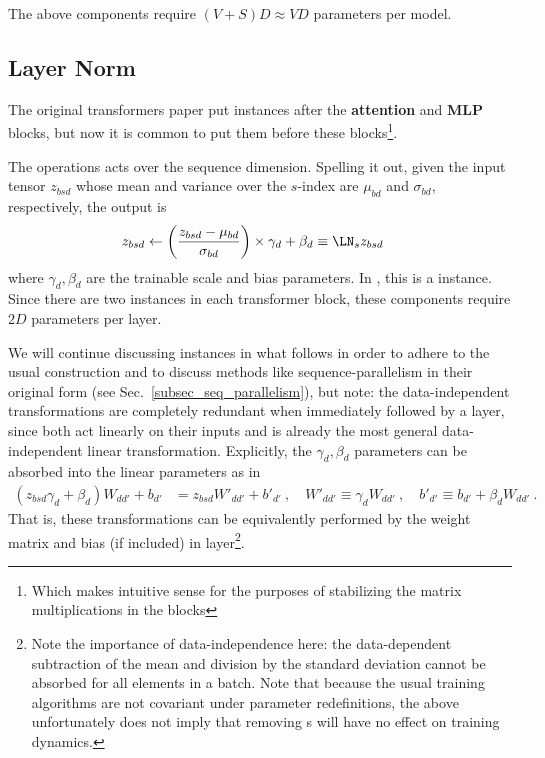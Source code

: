 \documentclass[11pt]{article}
\begin{document}
The above components require $ (V+S)D \approx VD $ parameters per model.



\subsection{Layer Norm \label{subsubsec_layer_norm} }

The original transformers paper \cite{vaswani2017attention} put  instances after
the \textbf{attention} and \textbf{MLP} blocks, but now it is common \cite{xiong2020layer} to put
them before these blocks\footnote{Which makes intuitive sense for the purposes of stabilizing the
	matrix multiplications in the blocks}.

The  operations acts over the sequence dimension. Spelling it out, given the
input tensor $ z _{ bsd } $ whose mean and variance over the $ s $-index are $ \mu _{ bd } $ and $
	\sigma _{ bd } $, respectively, the  output is
\begin{align}
	z _{ bsd } & \leftarrow \left ( \frac{ z _{ bsd } - \mu _{ bd } }{ \sigma _{ bd } } \right )\times \gamma _{ d }
	+ \beta _{ d } \equiv \LN _{ s } z _{ bsd}
\end{align}
where $ \gamma _{ d }, \beta  _{ d } $ are the trainable scale and bias parameters. In
, this is a  instance.
Since there are two  instances in each transformer block, these components require
$ 2D $ parameters per layer.

We will continue discussing  instances in what follows in order to adhere to the
usual construction and to discuss methods like sequence-parallelism in their original form (see
Sec.~\ref{subsec_seq_parallelism}), but note: the data-independent 
transformations are completely redundant when immediately followed by a  layer,
since both act linearly on their inputs and  is already the most general
data-independent linear transformation. Explicitly, the  $ \gamma _{ d }, \beta _{ d } $ parameters
can be absorbed into the linear parameters as in
\begin{align}
	\left (     z _{ bsd } \gamma _{ d } + \beta _{ d } \right )  W _{d d'}    + b _{ d' } & = z _{ bsd }
	W' _{ d d' } + b' _{ d' } \ , \quad W' _{ d d' } \equiv  \gamma _{  d} W _{ d d' } \ , \quad b' _{
	d' } \equiv b _{ d' } + \beta _{ d }W _{ d d' } \ .
\end{align}
That is, these transformations can be equivalently performed by the weight matrix and bias (if
included) in  layer\footnote{Note the importance of data-independence here: the
data-dependent subtraction of the mean and division by the standard deviation cannot be absorbed
for all elements in a batch.  Note that because the usual training algorithms are not covariant
under parameter redefinitions, the above unfortunately does not imply that removing
s will have no effect on training dynamics.}.
\end{document}
